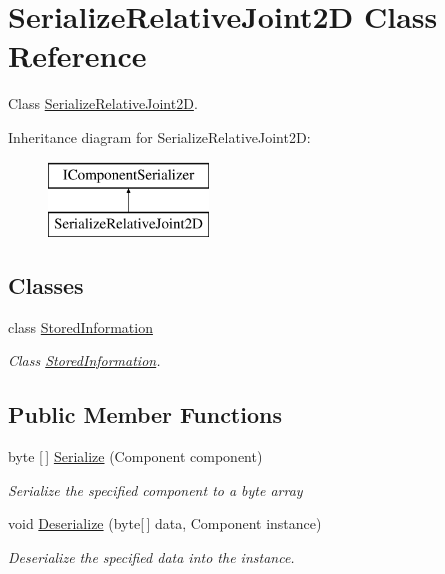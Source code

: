 \hypertarget{class_serialize_relative_joint2_d}{}\section{Serialize\+Relative\+Joint2D Class Reference}
\label{class_serialize_relative_joint2_d}


Class \hyperlink{class_serialize_relative_joint2_d}{Serialize\+Relative\+Joint2D}.  


Inheritance diagram for Serialize\+Relative\+Joint2D\+:\begin{figure}[H]
\begin{center}
\leavevmode
\includegraphics[height=2.000000cm]{class_serialize_relative_joint2_d}
\end{center}
\end{figure}
\subsection*{Classes}
\begin{DoxyCompactItemize}
\item 
class \hyperlink{class_serialize_relative_joint2_d_1_1_stored_information}{Stored\+Information}
\begin{DoxyCompactList}\small\item\em Class \hyperlink{class_serialize_relative_joint2_d_1_1_stored_information}{Stored\+Information}. \end{DoxyCompactList}\end{DoxyCompactItemize}
\subsection*{Public Member Functions}
\begin{DoxyCompactItemize}
\item 
byte \mbox{[}$\,$\mbox{]} \hyperlink{class_serialize_relative_joint2_d_a4769d5255430ffa12107acdc03a2e73a}{Serialize} (Component component)
\begin{DoxyCompactList}\small\item\em Serialize the specified component to a byte array \end{DoxyCompactList}\item 
void \hyperlink{class_serialize_relative_joint2_d_a48e35c8c7fa333d24579df5f00128a50}{Deserialize} (byte\mbox{[}$\,$\mbox{]} data, Component instance)
\begin{DoxyCompactList}\small\item\em Deserialize the specified data into the instance. \end{DoxyCompactList}\end{DoxyCompactItemize}


